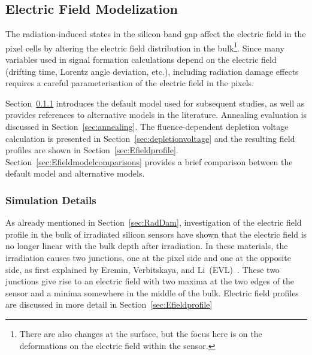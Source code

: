 \subsection{Electric Field Modelization}
\label{sec:ElecFieldMod}
The radiation-induced states in the silicon band gap affect the electric field in the pixel cells by altering 
the electric field distribution in the bulk\footnote{There are also changes at the surface, but the focus 
here is on the deformations on the electric field within the sensor.}. Since many variables used in signal 
formation calculations depend on the electric field (drifting time, Lorentz angle deviation, etc.), including 
radiation damage effects requires a careful parameterisation of the electric field in the pixels. 

Section~\ref{sec:ElectricField:SimulationDetails} introduces the default model used for subsequent studies, as well as provides references to alternative models in the literature.  Annealing evaluation is 
discussed in Section~\ref{sec:annealing}. The fluence-dependent depletion voltage calculation is presented in Section~\ref{sec:depletionvoltage} and the resulting field profiles are shown in Section~\ref{sec:Efieldprofile}.  Section~\ref{sec:Efieldmodelcomparisons} provides a brief comparison between the default model and alternative models.

\subsubsection{Simulation Details}
\label{sec:ElectricField:SimulationDetails}



As already mentioned in Section~\ref{sec:RadDam}, investigation of the electric field profile in the bulk of irradiated silicon sensors have shown that the electric field is no longer linear with the bulk depth after irradiation. In these materials, the irradiation causes two junctions, one at the pixel side and one at the opposite side, as first explained by Eremin, Verbitskaya, and Li~(EVL)~\cite{bib:DP}. These two junctions give rise to an electric field with two maxima at the two edges of the sensor and a minima somewhere in the middle of the bulk.  Electric field profiles are discussed in more detail in Section~\ref{sec:Efieldprofile}

